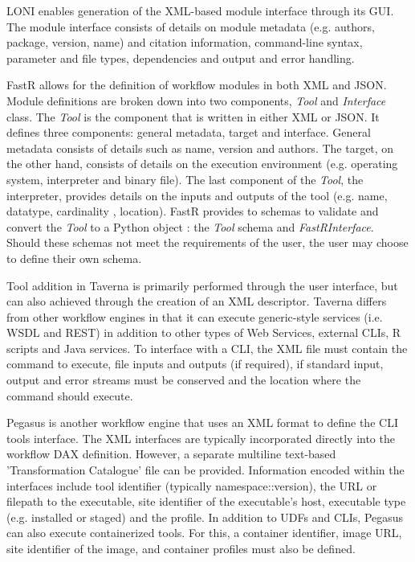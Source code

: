             LONI enables generation of 
            the XML-based module interface through its GUI. The module interface
            consists of details on module metadata (e.g.
            authors, package, version, name) and citation information, 
            command-line syntax, parameter and file types, dependencies and 
            output and error handling.

            FastR allows for the definition of workflow modules in both XML and 
            JSON. Module definitions are broken down into two components, 
            \textit{Tool} and \textit{Interface} class. The \textit{Tool} is the
            component that is written in either XML or JSON. It defines three
            components: general metadata, target and interface. General metadata
            consists of details such as name, version and authors. The target, 
            on the other hand, consists of details on the execution environment
            (e.g. operating system, interpreter and binary file). The last 
            component of the \textit{Tool}, the interpreter, provides details on
            the inputs and outputs of the tool (e.g. name, datatype, cardinality
            , location). FastR provides to schemas to validate and convert the 
            \textit{Tool} to a Python object
            : the \textit{Tool} schema and \textit{FastRInterface}. Should these
            schemas not meet the requirements of the user, the user may choose 
            to define their own schema.

            Tool addition in Taverna is primarily performed through the user 
            interface, but can also achieved through the creation of an XML
            descriptor. Taverna differs from other workflow engines in that it
            can 
            execute generic-style services (i.e. WSDL and REST) in addition to
            other types of Web Services, external CLIs, R scripts and
            Java services. To interface with a CLI, the XML file must contain 
            the command to execute, file inputs and outputs (if required), if 
            standard input, output and error streams must be conserved and the 
            location where the command should execute.

            Pegasus is another workflow engine that uses an XML format to 
            define the CLI tools interface. The XML interfaces are typically 
            incorporated directly into the workflow DAX definition. However, a 
            separate multiline text-based 'Transformation Catalogue' file can
            be provided. Information encoded within the interfaces include
            tool identifier (typically namespace::version), the URL or filepath
            to the executable, site identifier of the executable's host, 
            executable type (e.g. installed or staged) and the profile. In
            addition to UDFs and CLIs, Pegasus
            can also execute containerized tools. For this, a container 
            identifier, image URL, site identifier of the image, and container
            profiles must also be defined.

